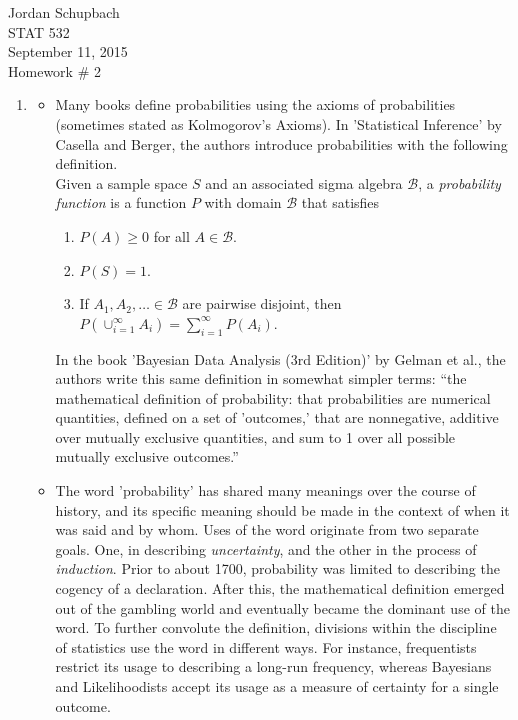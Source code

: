 \documentclass[12pt]{article}\usepackage[]{graphicx}\usepackage[]{color}
\begin{document}
{ \flushright Jordan Schupbach \\
STAT 532\\
September 11, 2015 \\}
Homework \# 2\\

\begin{enumerate}
\item 
\begin{itemize}
\item Many books define probabilities using the axioms of probabilities (sometimes stated as Kolmogorov's Axioms). In 'Statistical Inference' by Casella and Berger, the authors introduce probabilities with the following definition.\\

Given a sample space $S$ and an associated sigma algebra $\mathcal{B}$, a \emph{probability function} is a function $P$ with domain $\mathcal{B}$ that satisfies
\begin{enumerate}[label= {\bf \arabic*. }]
\item $P(A) \geq 0$ for all $A \in \mathcal{B}.$
\item $P(S) = 1.$
\item If $A_1, A_2, \dots \in \mathcal{B}$ are pairwise disjoint, then $P(\cup_{i=1}^{\infty} A_i ) = \sum_{i=1}^{\infty} P(A_i).$
\end{enumerate}
In the book 'Bayesian Data Analysis (3rd Edition)' by Gelman et al., the authors write this same definition in somewhat simpler terms: \enquote{the mathematical definition of probability: that probabilities are numerical quantities, defined on a set of 'outcomes,' that are nonnegative, additive over mutually exclusive quantities, and sum to 1 over all possible mutually exclusive outcomes.}
\item The word 'probability' has shared many meanings over the course of history, and its specific meaning should be made in the context of when it was said and by whom. Uses of the word originate from two separate goals. One, in describing \emph{uncertainty}, and the other in the process of \emph{induction}. Prior to about 1700, probability was limited to describing the cogency of a declaration. After this, the mathematical definition emerged out of the gambling world and eventually became the dominant use of the word. To further convolute the definition, divisions within the discipline of statistics use the word in different ways. For instance, frequentists restrict its usage to describing a long-run frequency, whereas Bayesians and Likelihoodists accept its usage as a measure of certainty for a single outcome.

\end{itemize}
\end{enumerate}
\end{document}
